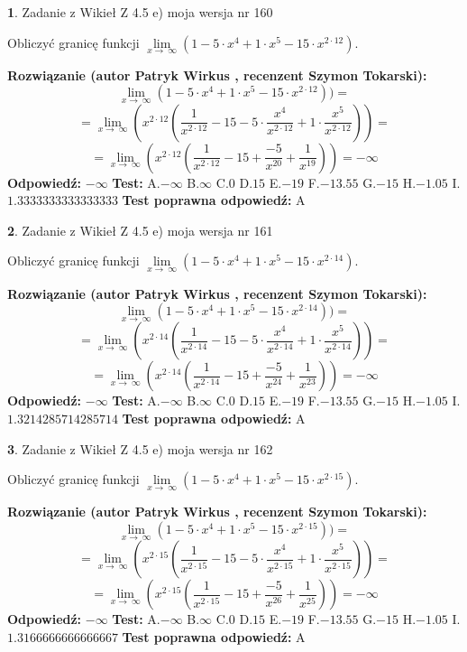 \documentclass[12pt, a4paper]{article}
\theoremstyle{definition} %
\newtheorem{zad}{}
\newcommand{\zadStart}[1]{\begin{zad}#1\newline}
\newcommand{\zadStop}{\end{zad}}
\newcommand{\rozwStart}[2]{\noindent \textbf{Rozwiązanie (autor #1 , recenzent #2): }\newline}
\newcommand{\rozwStop}{\newline}
\newcommand{\odpStart}{\noindent \textbf{Odpowiedź:}\newline}
\newcommand{\odpStop}{\newline}
\newcommand{\testStart}{\noindent \textbf{Test:}\newline}
\newcommand{\testStop}{\newline}
\newcommand{\kluczStart}{\noindent \textbf{Test poprawna odpowiedź:}\newline}
\newcommand{\kluczStop}{\newline}
\begin{document}
\zadStart{Zadanie z Wikieł Z 4.5 e) moja wersja nr 160}


Obliczyć granicę funkcji  $\lim\limits_{x\to\ \infty}(1 - 5 \cdot x^{4}+1 \cdot x^{5}- 15 \cdot x^{2\cdot12})$.
\zadStop
\rozwStart{Patryk Wirkus}{Szymon Tokarski}
$$\lim\limits_{x\to\ \infty}(1 - 5 \cdot x^{4}+1 \cdot x^{5}- 15 \cdot x^{2\cdot12}))=$$
$$=\lim\limits_{x\to\ \infty}(x^{2\cdot12}(\frac{1}{x^{2\cdot12}}-15 -5 \cdot \frac{x^{4}}{x^{2\cdot12}}+1 \cdot \frac{x^{5}}{x^{2\cdot12}}))=$$
$$=\lim\limits_{x\to\ \infty}(x^{2\cdot12}(\frac{1}{x^{2\cdot12}}-15 + \frac{-5}{x^{20}}+ \frac{1}{x^{19}}))=-\infty$$
\rozwStop
\odpStart
$-\infty$
\odpStop
\testStart
A.$-\infty$ B.$\infty$ C.$0$ D.$15$ E.$-19$
F.$-13.55$ G.$-15$
H.$-1.05$
I.$1.3333333333333333$
\testStop
\kluczStart
A
\kluczStop



\zadStart{Zadanie z Wikieł Z 4.5 e) moja wersja nr 161}


Obliczyć granicę funkcji  $\lim\limits_{x\to\ \infty}(1 - 5 \cdot x^{4}+1 \cdot x^{5}- 15 \cdot x^{2\cdot14})$.
\zadStop
\rozwStart{Patryk Wirkus}{Szymon Tokarski}
$$\lim\limits_{x\to\ \infty}(1 - 5 \cdot x^{4}+1 \cdot x^{5}- 15 \cdot x^{2\cdot14}))=$$
$$=\lim\limits_{x\to\ \infty}(x^{2\cdot14}(\frac{1}{x^{2\cdot14}}-15 -5 \cdot \frac{x^{4}}{x^{2\cdot14}}+1 \cdot \frac{x^{5}}{x^{2\cdot14}}))=$$
$$=\lim\limits_{x\to\ \infty}(x^{2\cdot14}(\frac{1}{x^{2\cdot14}}-15 + \frac{-5}{x^{24}}+ \frac{1}{x^{23}}))=-\infty$$
\rozwStop
\odpStart
$-\infty$
\odpStop
\testStart
A.$-\infty$ B.$\infty$ C.$0$ D.$15$ E.$-19$
F.$-13.55$ G.$-15$
H.$-1.05$
I.$1.3214285714285714$
\testStop
\kluczStart
A
\kluczStop



\zadStart{Zadanie z Wikieł Z 4.5 e) moja wersja nr 162}


Obliczyć granicę funkcji  $\lim\limits_{x\to\ \infty}(1 - 5 \cdot x^{4}+1 \cdot x^{5}- 15 \cdot x^{2\cdot15})$.
\zadStop
\rozwStart{Patryk Wirkus}{Szymon Tokarski}
$$\lim\limits_{x\to\ \infty}(1 - 5 \cdot x^{4}+1 \cdot x^{5}- 15 \cdot x^{2\cdot15}))=$$
$$=\lim\limits_{x\to\ \infty}(x^{2\cdot15}(\frac{1}{x^{2\cdot15}}-15 -5 \cdot \frac{x^{4}}{x^{2\cdot15}}+1 \cdot \frac{x^{5}}{x^{2\cdot15}}))=$$
$$=\lim\limits_{x\to\ \infty}(x^{2\cdot15}(\frac{1}{x^{2\cdot15}}-15 + \frac{-5}{x^{26}}+ \frac{1}{x^{25}}))=-\infty$$
\rozwStop
\odpStart
$-\infty$
\odpStop
\testStart
A.$-\infty$ B.$\infty$ C.$0$ D.$15$ E.$-19$
F.$-13.55$ G.$-15$
H.$-1.05$
I.$1.3166666666666667$
\testStop
\kluczStart
A
\kluczStop
\end{document}
